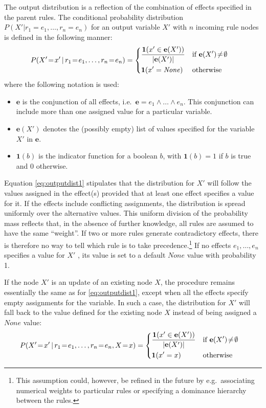 The output distribution is a reflection of the combination of effects specified in the parent rules. The conditional probability distribution $P(X'|r_1\!=\!e_1, \dots, r_n\!=\!e_n)$ for an output variable $X'$ with $n$ incoming rule nodes is defined in the following manner:
\begin{align}
&P(X'\!=\!x' \, | \, r_1\!=\!e_1, \dots, r_n\!=\!e_n) = \begin{dcases}
\frac{\mathbf{1}(x' \in {\mathbf{e}(X')})} { |\mathbf{e}(X')| } & \text{if } \mathbf{e}(X')\!\neq\!\emptyset \\
\mathbf{1}(x' = \mathit{None}) & \text{otherwise}
\end{dcases}
\label{eq:outputdist1}
\end{align}
where the following notation is used: \begin{itemize}
\item $\mathbf{e}$ is the conjunction of all effects, i.e.\ $\mathbf{e} = e_1 \land \dots \land e_n$.  This conjunction can include more than one assigned value for a particular variable.
\item $\mathbf{e}(X')$ denotes the (possibly empty) list of values specified for the variable $X'$ in $\mathbf{e}$. 
\item $\mathbf{1}(b)$ is the indicator function for a boolean $b$, with $\mathbf{1}(b)=1$ if $b$ is true and $0$ otherwise.
\end{itemize}

Equation \eqref{eq:outputdist1} stipulates that the distribution for $X'$ will follow the values assigned in the effect(s) provided that at least one effect specifies a value for it. If the effects include conflicting assignments, the distribution is spread uniformly over the alternative values. This uniform division of the probability mass reflects that, in the absence of further knowledge, all rules are assumed to have the same ``weight''. If two or more rules generate contradictory effects, there is therefore no way to tell which rule is to take precedence.\footnote{This assumption could, however, be refined in the future by e.g.\ associating numerical weights to particular rules or specifying a dominance hierarchy between the rules.} If no effects $e_1, \dots, e_n$ specifies a value for $X'$ , its value is set to a default $None$ value with probability 1. 

If the node $X'$ is an update of an existing node $X$, the procedure remains essentially the same as for \eqref{eq:outputdist1}, except when all the effects specify empty assignments for the variable. In such a case, the distribution for $X'$ will fall back to the value defined for the existing node $X$ instead of being assigned a $\mathit{None}$ value:
\begin{align}
&P(X'\!=\!x' \, | \, r_1\!=\!e_1, \dots, r_n\!=\!e_n, X\!=\!x) = \begin{dcases} 
\frac{\mathbf{1}(x' \in {\mathbf{e}(X')})} { |\mathbf{e}(X')| }  & \text{if } \mathbf{e}(X')\!\neq\!\emptyset \\
\mathbf{1}(x' = x) & \text{otherwise}
\end{dcases}\label{eq:outputdist2}
\end{align}

